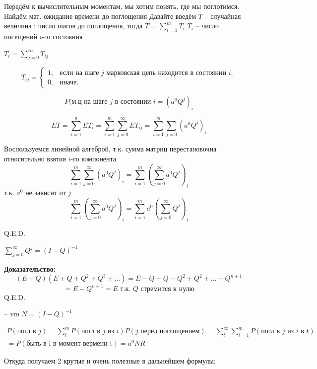Передём к вычислительным моментам, мы хотим понять, где мы поглотимся.
Найдём мат. ожидание времени до поглощения
Давайте введём $T$ -- случайная величина : число шагов до поглощения, тогда 
$T = \sum_{i=1}^mT_i$ $T_i$ -- число посещений $i$-го состояния

$T_i = \sum_{j = 0}^{\infty}T_{ij}$ 

\[
T_{ij} = 
\begin{cases}
1, & \text{если на шаге } j \text{ марковская цепь находится в состоянии } i, \\
0, & \text{иначе.}
\end{cases}
\]

$$P(\text{м.ц на шаге $j$ в состоянии $i$} = (a^0 Q^j)_i$$


$$ET = \sum_{i=1}^nET_i = \sum_{i = 1}^m\sum_{j = 0}^{\infty}ET_{ij} = \sum_{i = 1}^m\sum_{j = 0}(a^0 Q^j)_i$$

Воспользуемся линейной алгеброй, т.к. сумма матриц перестановочна относительно взятия $i$-го компонента
$$\sum_{i = 1}^m\sum_{j = 0}^{\infty}(a^0 Q^j)_i = \sum_{i = 1}^m(\sum_{j = 0}^{\infty}a^0 Q^j)_i$$
т.к. $a^0$ не зависит от $j$ 
$$\sum_{i = 1}^m(\sum_{j = 0}^{\infty}a^0 Q^j)_i = \sum_{i = 1}^m a^0 (\sum_{j = 0}^{\infty} Q^j)_i$$

\hfill Q.E.D.

$\sum_{j = 0}^{\infty}Q^j = (I - Q)^{-1}$

\textbf{Доказательство:}
    $$(E-Q)(E+Q+Q^2+Q^3+\ldots) = E - Q + Q - Q^2 + Q^2 + \ldots - Q^{n+1}$$ $$= E - Q^{n+1} = E \text{ т.к. $Q $ стремится к нулю} $$
\hfill Q.E.D.

 -- это $N = (I - Q)^{-1}$

\begin{multline*}
P(\text{погл в $j$}) = \sum_i^m P(\text{погл в $j$ из $i$}) P(\text{$j$ перед поглощением}) = \sum_t^{\infty}\sum_{i=1}^m P(\text{погл в $j$ из $i$ в $t$}) \\= P(\text{быть в i в момент вермени t}) = a^0NR
\end{multline*}


Откуда получаем 2 крутые и очень полезные в дальнейшем формулы: